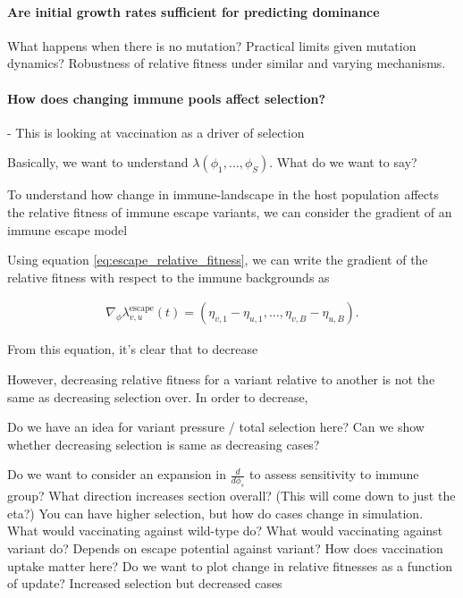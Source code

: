 \documentclass[12pt,oneside,letterpaper]{article}
\begin{document}
\paragraph{Are initial growth rates sufficient for predicting dominance}%

What happens when there is no mutation? Practical limits given mutation dynamics?
Robustness of relative fitness under similar and varying mechanisms.

\paragraph{How does changing immune pools affect selection?}%
- This is looking at vaccination as a driver of selection

Basically, we want to understand $\lambda(\phi_{1}, \ldots, \phi_{S})$. What do we want to say?

To understand how change in immune-landscape in the host population affects the relative fitness of immune escape variants, we can consider the gradient of an immune escape model

Using equation \ref{eq:escape_relative_fitness}, we can write the gradient of the relative fitness with respect to the immune backgrounds as

\begin{align*}
    \nabla_{\phi} \lambda^{\text{escape}}_{v,u}(t) = (\eta_{v,1} - \eta_{u,1}, \ldots, \eta_{v,B} - \eta_{u,B}).
\end{align*}

From this equation, it's clear that to decrease 




However, decreasing relative fitness for a variant relative to another is not the same as decreasing selection over.
In order to decrease, 

Do we have an idea for variant pressure / total selection here? Can we show whether decreasing selection is same as decreasing cases?

Do we want to consider an expansion in $\frac{d}{d\phi_{s}}$ to assess sensitivity to immune group? What direction increases section overall? (This will come down to just the eta?)
You can have higher selection, but how do cases change in simulation. What would vaccinating against wild-type do? What would vaccinating against variant do? Depends on escape potential against variant?
How does vaccination uptake matter here? Do we want to plot change in relative fitnesses as a function of update? Increased selection but decreased cases
\end{document}
